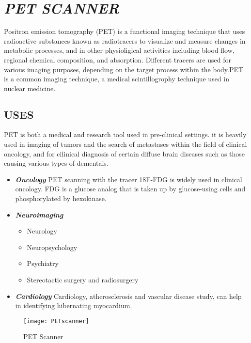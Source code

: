 \documentclass[12pt]{article}
\begin{document}
 \section{\textsl{PET SCANNER}}
Positron emission tomography (PET) is a functional imaging technique that uses radioactive substances known as radiotracers to visualize and measure changes in metabolic processes, and in other physioligical activities including blood flow, regional chemical composition, and absorption. \newline\newline
Different tracers are used for various imaging purposes, depending on the target process within the body.PET is a common imaging technique, a medical scintillogrophy technique used in nuclear medicine.


\subsection{USES}

PET is both a medical and research tool used in pre-clinical settings. it is heavily used in imaging of tumors and the search of metastases within the field of clinical oncology, and for cilinical diagnosis of certain diffuse brain diseases such as those causing various types of dementais.


\begin{itemize}
\item {\textbf{\textsl{Oncology}}}
	\newline PET scanning with the tracer 18F-FDG is widely used in clinical oncology. FDG is a glucose analog that is taken up by glucose-using cells and phosphorylated by hexokinase.
\item {\textbf{\textsl{Neuroimaging}}}
	\begin{itemize}
	\item Neurology
	\item Neuropsychology
	\item Psychiatry
	\item Stereotactic surgery and radiosurgery
	\end{itemize}
\item {\textbf{\textsl{Cardiology}}}
	\newline Cardiology, atherosclerosis and vascular disease study, can help in identifying hibernating myocardium.
	
\end{itemize}


\begin{figure}
\centering
\texttt{[image: PETscanner]}
\caption{PET Scanner}
\end{figure}
\end{document}
